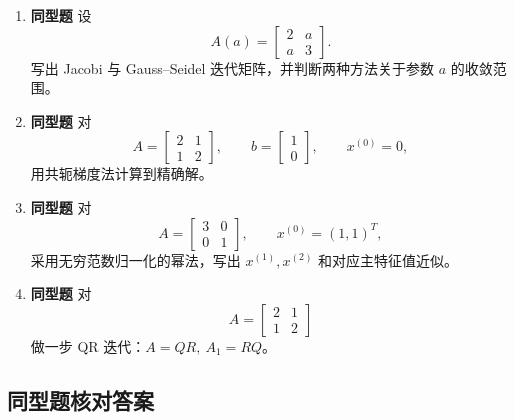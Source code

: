 \documentclass{article}
\newcommand{\simtag}{\textcolor{blue!65!black}{\textbf{同型题}}}
\begin{document}
\begin{enumerate}
  \item \simtag{} 设
  \[
    A(a)=\begin{bmatrix}2&a\\a&3\end{bmatrix}.
  \]
  写出 Jacobi 与 Gauss--Seidel 迭代矩阵，并判断两种方法关于参数 $a$ 的收敛范围。

  \item \simtag{} 对
  \[
    A=\begin{bmatrix}2&1\\1&2\end{bmatrix},\qquad b=\begin{bmatrix}1\\0\end{bmatrix},\qquad x^{(0)}=0,
  \]
  用共轭梯度法计算到精确解。

  \item \simtag{} 对
  \[
    A=\begin{bmatrix}3&0\\0&1\end{bmatrix},\qquad x^{(0)}=(1,1)^T,
  \]
  采用无穷范数归一化的幂法，写出 $x^{(1)},x^{(2)}$ 和对应主特征值近似。

  \item \simtag{} 对
  \[
    A=\begin{bmatrix}2&1\\1&2\end{bmatrix}
  \]
  做一步 QR 迭代：$A=QR,\ A_1=RQ$。
\end{enumerate}

\subsection{同型题核对答案}
\end{document}

